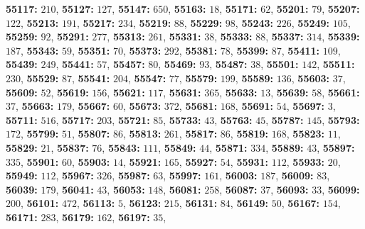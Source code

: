 \textsf{\bfseries 55117:} $210$, \textsf{\bfseries 55127:} $127$, \textsf{\bfseries 55147:} $650$, \textsf{\bfseries 55163:} $18$, \textsf{\bfseries 55171:} $62$, \textsf{\bfseries 55201:} $79$, \textsf{\bfseries 55207:} $122$, \textsf{\bfseries 55213:} $191$, \textsf{\bfseries 55217:} $234$, \textsf{\bfseries 55219:} $88$, \textsf{\bfseries 55229:} $98$, \textsf{\bfseries 55243:} $226$, \textsf{\bfseries 55249:} $105$, \textsf{\bfseries 55259:} $92$, \textsf{\bfseries 55291:} $277$, \textsf{\bfseries 55313:} $261$, \textsf{\bfseries 55331:} $38$, \textsf{\bfseries 55333:} $88$, \textsf{\bfseries 55337:} $314$, \textsf{\bfseries 55339:} $187$, \textsf{\bfseries 55343:} $59$, \textsf{\bfseries 55351:} $70$, \textsf{\bfseries 55373:} $292$, \textsf{\bfseries 55381:} $78$, \textsf{\bfseries 55399:} $87$, \textsf{\bfseries 55411:} $109$, \textsf{\bfseries 55439:} $249$, \textsf{\bfseries 55441:} $57$, \textsf{\bfseries 55457:} $80$, \textsf{\bfseries 55469:} $93$, \textsf{\bfseries 55487:} $38$, \textsf{\bfseries 55501:} $142$, \textsf{\bfseries 55511:} $230$, \textsf{\bfseries 55529:} $87$, \textsf{\bfseries 55541:} $204$, \textsf{\bfseries 55547:} $77$, \textsf{\bfseries 55579:} $199$, \textsf{\bfseries 55589:} $136$, \textsf{\bfseries 55603:} $37$, \textsf{\bfseries 55609:} $52$, \textsf{\bfseries 55619:} $156$, \textsf{\bfseries 55621:} $117$, \textsf{\bfseries 55631:} $365$, \textsf{\bfseries 55633:} $13$, \textsf{\bfseries 55639:} $58$, \textsf{\bfseries 55661:} $37$, \textsf{\bfseries 55663:} $179$, \textsf{\bfseries 55667:} $60$, \textsf{\bfseries 55673:} $372$, \textsf{\bfseries 55681:} $168$, \textsf{\bfseries 55691:} $54$, \textsf{\bfseries 55697:} $3$, \textsf{\bfseries 55711:} $516$, \textsf{\bfseries 55717:} $203$, \textsf{\bfseries 55721:} $85$, \textsf{\bfseries 55733:} $43$, \textsf{\bfseries 55763:} $45$, \textsf{\bfseries 55787:} $145$, \textsf{\bfseries 55793:} $172$, \textsf{\bfseries 55799:} $51$, \textsf{\bfseries 55807:} $86$, \textsf{\bfseries 55813:} $261$, \textsf{\bfseries 55817:} $86$, \textsf{\bfseries 55819:} $168$, \textsf{\bfseries 55823:} $11$, \textsf{\bfseries 55829:} $21$, \textsf{\bfseries 55837:} $76$, \textsf{\bfseries 55843:} $111$, \textsf{\bfseries 55849:} $44$, \textsf{\bfseries 55871:} $334$, \textsf{\bfseries 55889:} $43$, \textsf{\bfseries 55897:} $335$, \textsf{\bfseries 55901:} $60$, \textsf{\bfseries 55903:} $14$, \textsf{\bfseries 55921:} $165$, \textsf{\bfseries 55927:} $54$, \textsf{\bfseries 55931:} $112$, \textsf{\bfseries 55933:} $20$, \textsf{\bfseries 55949:} $112$, \textsf{\bfseries 55967:} $326$, \textsf{\bfseries 55987:} $63$, \textsf{\bfseries 55997:} $161$, \textsf{\bfseries 56003:} $187$, \textsf{\bfseries 56009:} $83$, \textsf{\bfseries 56039:} $179$, \textsf{\bfseries 56041:} $43$, \textsf{\bfseries 56053:} $148$, \textsf{\bfseries 56081:} $258$, \textsf{\bfseries 56087:} $37$, \textsf{\bfseries 56093:} $33$, \textsf{\bfseries 56099:} $200$, \textsf{\bfseries 56101:} $472$, \textsf{\bfseries 56113:} $5$, \textsf{\bfseries 56123:} $215$, \textsf{\bfseries 56131:} $84$, \textsf{\bfseries 56149:} $50$, \textsf{\bfseries 56167:} $154$, \textsf{\bfseries 56171:} $283$, \textsf{\bfseries 56179:} $162$, \textsf{\bfseries 56197:} $35$, 
